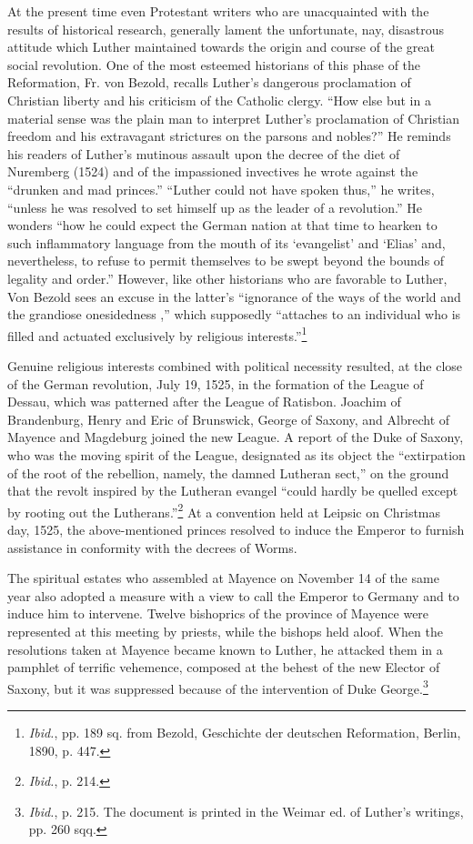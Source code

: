 At the present time even Protestant writers who are unacquainted with the
results of historical research, generally lament the unfortunate, nay,
disastrous attitude which Luther maintained towards the origin and course
of the great social revolution. One of the most esteemed historians of this
phase of the Reformation, Fr. von Bezold, recalls Luther’s dangerous proclamation
of Christian liberty and his criticism of the Catholic clergy. “How
else but in a material sense was the plain man to interpret Luther’s proclamation
of Christian freedom and his extravagant strictures on the parsons and
nobles?” He reminds his readers of Luther’s mutinous assault upon the decree
of the diet of Nuremberg (1524) and of the impassioned invectives he
wrote against the “drunken and mad princes.” “Luther could not have
spoken thus,” he writes, “unless he was resolved to set himself up as the
leader of a revolution.” He wonders “how he could expect the German
nation at that time to hearken to such inflammatory language from the
mouth of its ‘evangelist’ and ‘Elias’ and, nevertheless, to refuse to permit
themselves to be swept beyond the bounds of legality and order.” However,
like other historians who are favorable to Luther, Von Bezold sees an excuse
in the latter’s “ignorance of the ways of the world and the grandiose onesidedness
,” which supposedly “attaches to an individual who is filled and
actuated exclusively by religious interests.”\footnote
{\textit{Ibid.}, pp. 189 sq. from Bezold, Geschichte der deutschen Reformation, Berlin, 1890,
p. 447.}

Genuine religious interests combined with political necessity resulted,
at the close of the German revolution, July 19, 1525, in the
formation of the League of Dessau, which was patterned after the
League of Ratisbon. Joachim of Brandenburg, Henry and Eric of
Brunswick, George of Saxony, and Albrecht of Mayence and Magdeburg
joined the new League. A report of the Duke of Saxony, who
was the moving spirit of the League, designated as its object the
“extirpation of the root of the rebellion, namely, the damned
Lutheran sect,” on the ground that the revolt inspired by the Lutheran
evangel “could hardly be quelled except by rooting out the
Lutherans.”\footnote{\textit{Ibid.}, p. 214.}
At a convention held at Leipsic on Christmas day,
1525, the above-mentioned princes resolved to induce the Emperor
to furnish assistance in conformity with the decrees of Worms.

The spiritual estates who assembled at Mayence on November 14
of the same year also adopted a measure with a view to call the Emperor
to Germany and to induce him to intervene. Twelve bishoprics
of the province of Mayence were represented at this meeting by
priests, while the bishops held aloof. When the resolutions taken at
Mayence became known to Luther, he attacked them in a pamphlet of
terrific vehemence, composed at the behest of the new Elector of
Saxony, but it was suppressed because of the intervention of Duke
George.\footnote
{\textit{Ibid.}, p. 215. The document is printed in the Weimar ed. of Luther’s writings, pp.
260 sqq.}


